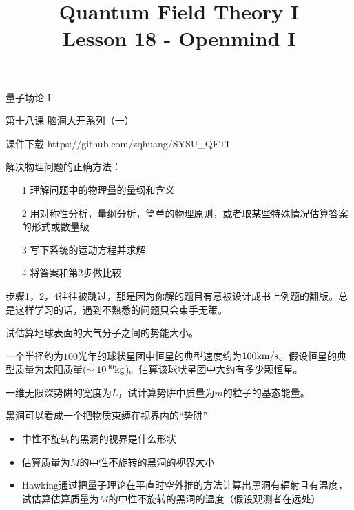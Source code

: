 \documentclass[CJK]{beamer}
\title{Quantum Field Theory I \\ Lesson 18 - Openmind I}
\author{}
\date{}
\begin{document}
\begin{frame}
 
\begin{center}
\begin{Large}
\bch
量子场论 I 

{\vskip 0.3in}

第十八课 脑洞大开系列（一）

\ech
\end{Large}
\end{center}

\vskip 0.2in

\bch
课件下载
\ech
https://github.com/zqhuang/SYSU\_QFTI

\end{frame}


\begin{frame}
\bch
解决物理问题的正确方法：
\begin{itemize}
\item[1]{理解问题中的物理量的量纲和含义}
\item[2]{用对称性分析，量纲分析，简单的物理原则，或者取某些特殊情况估算答案的形式或数量级}
\item[3]{写下系统的运动方程并求解}
\item[4]{将答案和第2步做比较}
\end{itemize}

\skipline
步骤1，2，4往往被跳过，那是因为你解的题目有意被设计成书上例题的翻版。总是这样学习的话，遇到不熟悉的问题只会束手无策。

\ech
\end{frame}


\begin{frame}
\bch
试估算地球表面的大气分子之间的势能大小。
\ech
\end{frame}


\begin{frame}
\bch
一个半径约为$100$光年的球状星团中恒星的典型速度约为$100\mathrm{km}/\mathrm{s}$。假设恒星的典型质量为太阳质量($\sim 10^{30}\mathrm{kg}$)。估算该球状星团中大约有多少颗恒星。
\ech
\end{frame}



\begin{frame}
\bch
一维无限深势阱的宽度为$L$，试计算势阱中质量为$m$的粒子的基态能量。
\ech
\end{frame}



\begin{frame}
\bch
黑洞可以看成一个把物质束缚在视界内的“势阱”
\begin{itemize}
\item{中性不旋转的黑洞的视界是什么形状}
\item{估算质量为$M$的中性不旋转的黑洞的视界大小}
\item{Hawking通过把量子理论在平直时空外推的方法计算出黑洞有辐射且有温度，试估算估算质量为$M$的中性不旋转的黑洞的温度（假设观测者在远处）}
\end{itemize}
\ech
\end{frame}
\end{document}
